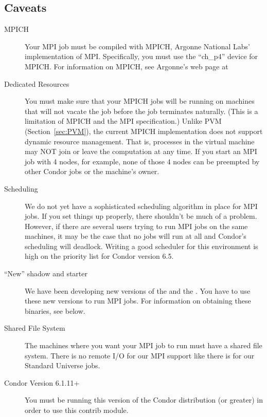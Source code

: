 \subsection{\label{sec:MPI-caveats}Caveats}
\begin{description}
\item[MPICH] Your MPI job must be compiled with MPICH, Argonne National
Labs' implementation of MPI.  Specifically, you must use the ``ch\_p4'' 
device for MPICH.  For information on MPICH, see Argonne's web page
at 

\item[Dedicated Resources] You must make sure that your MPICH jobs
will be running on machines that will not vacate the job before the job
terminates naturally.  (This is a limitation of MPICH and the MPI 
specification.) Unlike PVM (Section~\ref{sec:PVM}), the current MPICH
implementation does not support dynamic resource management.  That is, 
processes in the virtual machine may NOT join or leave the computation at 
any time.  If you start an MPI job with 4 nodes, for example, none of those 4 
nodes can be preempted by other Condor jobs or the machine's owner.

\item[Scheduling] We do not yet have a sophisticated scheduling 
algorithm in place for MPI jobs.  If you set things up properly, 
there shouldn't be much of a problem.  However, if there are several
users trying to run MPI jobs on the same machines, it may be the case 
that no jobs will run at all and Condor's scheduling will deadlock.  
Writing a good scheduler for this environment is high on the priority 
list for Condor version 6.5.

\item[``New'' shadow and starter] We have been developing new versions
of the  and the .  You have to use these
new versions to run MPI jobs.  For information on obtaining these 
binaries, see below.

\item[Shared File System] The machines where you want your MPI job
to run must have a shared file system.  There is no remote I/O for
our MPI support like there is for our Standard Universe jobs.

\item[Condor Version 6.1.11+] You must be running this version of 
the Condor distribution (or greater) in order to use this contrib 
module.
\end{description}


